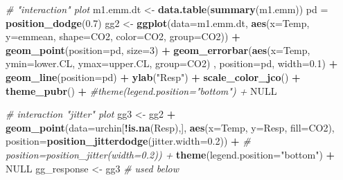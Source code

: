 \documentclass[]{book}
\newenvironment{Shaded}{\begin{snugshade}}{\end{snugshade}}
\newcommand{\KeywordTok}[1]{\textcolor[rgb]{0.13,0.29,0.53}{\textbf{#1}}}
\newcommand{\DataTypeTok}[1]{\textcolor[rgb]{0.13,0.29,0.53}{#1}}
\newcommand{\DecValTok}[1]{\textcolor[rgb]{0.00,0.00,0.81}{#1}}
\newcommand{\FloatTok}[1]{\textcolor[rgb]{0.00,0.00,0.81}{#1}}
\newcommand{\StringTok}[1]{\textcolor[rgb]{0.31,0.60,0.02}{#1}}
\newcommand{\CommentTok}[1]{\textcolor[rgb]{0.56,0.35,0.01}{\textit{#1}}}
\newcommand{\OtherTok}[1]{\textcolor[rgb]{0.56,0.35,0.01}{#1}}
\newcommand{\OperatorTok}[1]{\textcolor[rgb]{0.81,0.36,0.00}{\textbf{#1}}}
\newcommand{\NormalTok}[1]{#1}
\begin{document}
\begin{Shaded}
\begin{Highlighting}[]
\CommentTok{# "interaction" plot}
\NormalTok{m1.emm.dt <-}\StringTok{ }\KeywordTok{data.table}\NormalTok{(}\KeywordTok{summary}\NormalTok{(m1.emm))}
\NormalTok{pd =}\StringTok{ }\KeywordTok{position_dodge}\NormalTok{(}\FloatTok{0.7}\NormalTok{)}
\NormalTok{gg2 <-}\StringTok{ }\KeywordTok{ggplot}\NormalTok{(}\DataTypeTok{data=}\NormalTok{m1.emm.dt, }
                      \KeywordTok{aes}\NormalTok{(}\DataTypeTok{x=}\NormalTok{Temp, }
                          \DataTypeTok{y=}\NormalTok{emmean, }
                          \DataTypeTok{shape=}\NormalTok{CO2, }
                          \DataTypeTok{color=}\NormalTok{CO2, }
                          \DataTypeTok{group=}\NormalTok{CO2)) }\OperatorTok{+}
\StringTok{  }\KeywordTok{geom_point}\NormalTok{(}\DataTypeTok{position=}\NormalTok{pd, }\DataTypeTok{size=}\DecValTok{3}\NormalTok{) }\OperatorTok{+}
\StringTok{  }\KeywordTok{geom_errorbar}\NormalTok{(}\KeywordTok{aes}\NormalTok{(}\DataTypeTok{x=}\NormalTok{Temp, }
                                 \DataTypeTok{ymin=}\NormalTok{lower.CL, }
                                 \DataTypeTok{ymax=}\NormalTok{upper.CL,}
                                 \DataTypeTok{group=}\NormalTok{CO2)}
\NormalTok{                , }\DataTypeTok{position=}\NormalTok{pd, }\DataTypeTok{width=}\FloatTok{0.1}\NormalTok{) }\OperatorTok{+}
\StringTok{  }\KeywordTok{geom_line}\NormalTok{(}\DataTypeTok{position=}\NormalTok{pd) }\OperatorTok{+}
\StringTok{  }\KeywordTok{ylab}\NormalTok{(}\StringTok{"Resp"}\NormalTok{) }\OperatorTok{+}
\StringTok{  }\KeywordTok{scale_color_jco}\NormalTok{() }\OperatorTok{+}
\StringTok{  }\KeywordTok{theme_pubr}\NormalTok{() }\OperatorTok{+}
\StringTok{  }\CommentTok{#theme(legend.position="bottom") +}
\StringTok{  }\OtherTok{NULL}

\CommentTok{# interaction "jitter" plot}
\NormalTok{gg3 <-}\StringTok{ }\NormalTok{gg2 }\OperatorTok{+}
\StringTok{  }\KeywordTok{geom_point}\NormalTok{(}\DataTypeTok{data=}\NormalTok{urchin[}\OperatorTok{!}\KeywordTok{is.na}\NormalTok{(Resp),], }\KeywordTok{aes}\NormalTok{(}\DataTypeTok{x=}\NormalTok{Temp, }\DataTypeTok{y=}\NormalTok{Resp, }\DataTypeTok{fill=}\NormalTok{CO2),}
             \DataTypeTok{position=}\KeywordTok{position_jitterdodge}\NormalTok{(}\DataTypeTok{jitter.width=}\FloatTok{0.2}\NormalTok{)) }\OperatorTok{+}
\CommentTok{#             position=position_jitter(width=0.2)) +}
\StringTok{  }\KeywordTok{theme}\NormalTok{(}\DataTypeTok{legend.position=}\StringTok{"bottom"}\NormalTok{) }\OperatorTok{+}
\StringTok{  }\OtherTok{NULL}
\NormalTok{gg_response <-}\StringTok{ }\NormalTok{gg3 }\CommentTok{# used below}


\end{Highlighting}
\end{Shaded}
\end{document}
